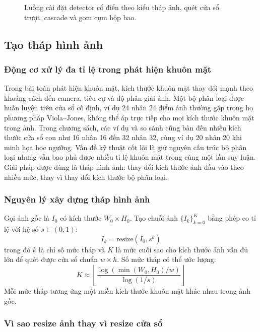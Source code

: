 \begin{figure}[H]
\caption{Luồng cài đặt detector cổ điển theo kiểu tháp ảnh, quét cửa sổ trượt, cascade và gom cụm hộp bao.}
\label{fig:classical-cascade-detailed-flow}
\end{figure}

\subsection{Tạo tháp hình ảnh}

\subsubsection{Động cơ xử lý đa tỉ lệ trong phát hiện khuôn mặt}

Trong bài toán phát hiện khuôn mặt, kích thước khuôn mặt thay đổi mạnh theo khoảng cách đến camera, tiêu cự và độ phân giải ảnh.
Một bộ phân loại được huấn luyện trên cửa sổ cố định, ví dụ 24 nhân 24 điểm ảnh thường gặp trong họ phương pháp Viola--Jones, không thể áp trực tiếp cho mọi kích thước khuôn mặt trong ảnh.
Trong chương sách, các ví dụ và so sánh cũng bàn đến nhiều kích thước cửa sổ con như 16 nhân 16 đến 32 nhân 32, cùng ví dụ 20 nhân 20 khi minh họa học ngưỡng.  \cite{li2012facechapter}
Vấn đề kỹ thuật cốt lõi là giữ nguyên cấu trúc bộ phân loại nhưng vẫn bao phủ được nhiều tỉ lệ khuôn mặt trong cùng một lần suy luận.
Giải pháp được dùng là tháp hình ảnh:
thay đổi kích thước ảnh đầu vào theo nhiều mức, thay vì thay đổi kích thước bộ phân loại.  \cite{viola2001rapid,li2012facechapter}

\subsubsection{Nguyên lý xây dựng tháp hình ảnh}

Gọi ảnh gốc là $I_0$ có kích thước $W_0 \times H_0$.
Tạo chuỗi ảnh $\{I_k\}_{k=0}^{K}$ bằng phép co tỉ lệ với hệ số $s \in (0,1)$:
\[
I_k=\mathrm{resize}(I_0, s^k)
\]
trong đó $k$ là chỉ số mức tháp và $K$ là mức cuối sao cho kích thước ảnh vẫn đủ lớn để quét được cửa sổ chuẩn $w \times h$.
Số mức tháp có thể ước lượng:
\[
K \approx \left\lfloor
\frac{\log \left(\min(W_0,H_0)/w\right)}{\log (1/s)}
\right\rfloor
\]
Mỗi mức tháp tương ứng một miền kích thước khuôn mặt khác nhau trong ảnh gốc.  \cite{li2012facechapter}

\subsubsection{Vì sao resize ảnh thay vì resize cửa sổ}

